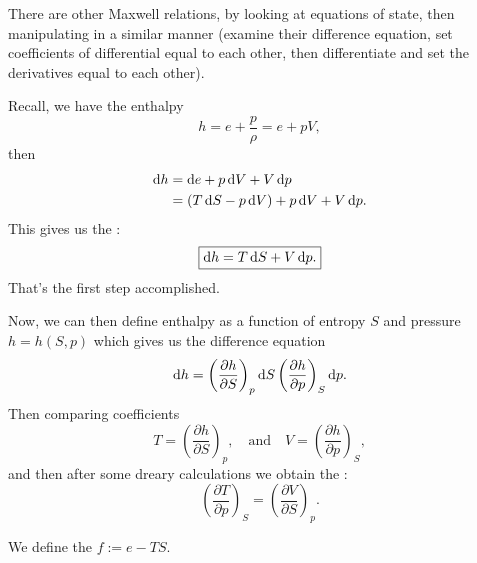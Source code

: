 \begin{remark}
There are other Maxwell relations, by looking at equations of state,
then manipulating in a similar manner (examine their difference
equation, set coefficients of differential equal to each other, then
differentiate and set the derivatives equal to each other).
\end{remark}

\begin{example}[Enthalpy]
Recall, we have the enthalpy
\begin{equation}
h = e + \frac{p}{\rho}=e+pV,
\end{equation}
then
\begin{subequations}
  \begin{align}
\mathrm{d} h &= \mathrm{d} e + p\,\mathrm{d} V + V\,\mathrm{d} p\\
&= (T\,\mathrm{d} S - p\,\mathrm{d} V) + p\,\mathrm{d} V + V\,\mathrm{d} p.
  \end{align}
\end{subequations}
This gives us the :
\begin{equation}
\boxed{\mathrm{d} h = T\,\mathrm{d} S + V\,\mathrm{d} p.}
\end{equation}
That's the first step accomplished.

Now, we can then define enthalpy as a function of entropy $S$ and
pressure $h=h(S,p)$ which gives us the difference equation
\begin{equation}
\mathrm{d} h = \left(\frac{\partial h}{\partial S}\right)_{p}\mathrm{d} S
 \left(\frac{\partial h}{\partial p}\right)_{S}\mathrm{d} p.
\end{equation}
Then comparing coefficients
\begin{equation}
T = \left(\frac{\partial h}{\partial S}\right)_{p},\quad\mbox{and}\quad
V = \left(\frac{\partial h}{\partial p}\right)_{S},
\end{equation}
and then after some dreary calculations we obtain the :
\begin{equation}
\boxed{\left(\frac{\partial T}{\partial p}\right)_{S} = \left(\frac{\partial V}{\partial S}\right)_{p}.}
\end{equation}
\end{example}

\begin{definition}
We define the  $f := e - TS$.
\end{definition}

